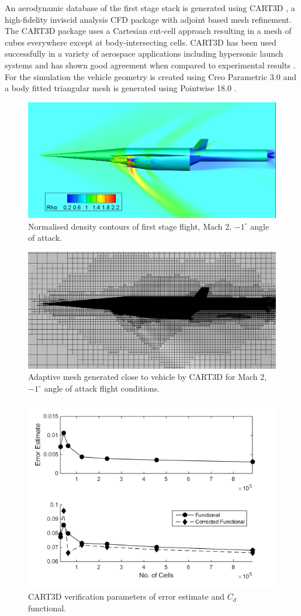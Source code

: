 \documentclass[]{aiaa-tc}
\begin{document}
An aerodynamic database of the first stage stack is generated using CART3D \cite{CART3D}, a high-fidelity inviscid analysis CFD package with adjoint based mesh refinement. The CART3D package uses a Cartesian cut-cell approach \cite{Aftosmis1997} resulting in a mesh of cubes everywhere except at body-intersecting cells. CART3D has been used successfully in a variety of aerospace applications including hypersonic launch systems \cite{Mehta2015} and has shown good agreement when compared to experimental results \cite{Aftosmis2011}.
For the simulation the vehicle geometry is created using Creo Parametric 3.0 \cite{CREO} and a body fitted triangular mesh is generated using Pointwise 18.0 \cite{Pointwise}.
\begin{figure}[ht]
	\centering
	\includegraphics[width=0.6\linewidth]{CARTcontour}
	\caption{Normalised density contours of first stage flight, Mach 2, $-1^\circ$ angle of attack.}
	\label{fig:CARTcontour}
\end{figure}
\begin{figure}[ht]
	\centering
	\includegraphics[width=0.6\linewidth]{CARTmesh}
	\caption{Adaptive mesh generated close to vehicle by CART3D for Mach 2, $-1^\circ$ angle of attack flight conditions.}
	\label{fig:CARTmesh}
\end{figure}
\begin{figure}[ht]
	\centering
	\includegraphics[width=0.4\linewidth]{CART}
	\caption{CART3D verification parameters of error estimate and $C_d$ functional.}
	\label{fig:CART}
\end{figure}
\end{document}
